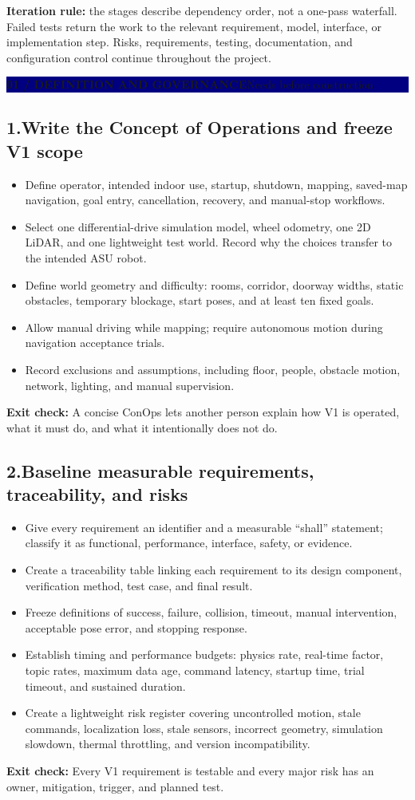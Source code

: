 \documentclass[10pt,a4paper]{article}
\newcommand{\cb}{\(\square\)}
\newcommand{\exitcheck}[1]{\vspace{2pt}\colorbox{PaleTeal}{\parbox{0.965\linewidth}{\textbf{Exit check:} #1}}}
\newcommand{\workstep}[2]{\subsection{\texorpdfstring{#1\quad #2}{#1\ #2}}}
\newcommand{\stagebanner}[2]{%
  \vspace{2pt}
  \noindent\colorbox{Navy}{\parbox{0.965\linewidth}{\color{white}\textbf{#1}\hfill #2}}
  \vspace{2pt}
}
\begin{document}
\textbf{Iteration rule:} the stages describe dependency order, not a one-pass waterfall. Failed tests return the work to the relevant requirement, model, interface, or implementation step. Risks, requirements, testing, documentation, and configuration control continue throughout the project.

\newpage
\stagebanner{01 / DEFINITION AND GOVERNANCE}{Needs before construction}

\workstep{1.}{Write the Concept of Operations and freeze V1 scope}
\begin{itemize}
  \item[\cb] Define operator, intended indoor use, startup, shutdown, mapping, saved-map navigation, goal entry, cancellation, recovery, and manual-stop workflows.
  \item[\cb] Select one differential-drive simulation model, wheel odometry, one 2D LiDAR, and one lightweight test world. Record why the choices transfer to the intended ASU robot.
  \item[\cb] Define world geometry and difficulty: rooms, corridor, doorway widths, static obstacles, temporary blockage, start poses, and at least ten fixed goals.
  \item[\cb] Allow manual driving while mapping; require autonomous motion during navigation acceptance trials.
  \item[\cb] Record exclusions and assumptions, including floor, people, obstacle motion, network, lighting, and manual supervision.
\end{itemize}
\exitcheck{A concise ConOps lets another person explain how V1 is operated, what it must do, and what it intentionally does not do.}

\workstep{2.}{Baseline measurable requirements, traceability, and risks}
\begin{itemize}
  \item[\cb] Give every requirement an identifier and a measurable ``shall'' statement; classify it as functional, performance, interface, safety, or evidence.
  \item[\cb] Create a traceability table linking each requirement to its design component, verification method, test case, and final result.
  \item[\cb] Freeze definitions of success, failure, collision, timeout, manual intervention, acceptable pose error, and stopping response.
  \item[\cb] Establish timing and performance budgets: physics rate, real-time factor, topic rates, maximum data age, command latency, startup time, trial timeout, and sustained duration.
  \item[\cb] Create a lightweight risk register covering uncontrolled motion, stale commands, localization loss, stale sensors, incorrect geometry, simulation slowdown, thermal throttling, and version incompatibility.
\end{itemize}
\exitcheck{Every V1 requirement is testable and every major risk has an owner, mitigation, trigger, and planned test.}
\end{document}
